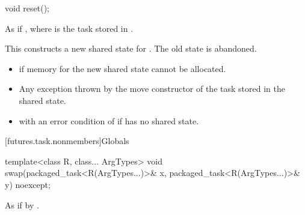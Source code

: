 %
\begin{itemdecl}
void reset();
\end{itemdecl}

\begin{itemdescr}
\pnum
\effects
As if , where
 is the task stored in
.
\begin{note}
This constructs a new shared state for . The
old state is abandoned.
\end{note}

\pnum
\throws
\begin{itemize}
\item {} if memory for the new shared state cannot be allocated.
\item Any exception thrown by the move constructor of the task stored in the shared
state.
\item {} with an error condition of  if 
has no shared state.
\end{itemize}
\end{itemdescr}

[futures.task.nonmembers]{Globals}

%
\begin{itemdecl}
template<class R, class... ArgTypes>
  void swap(packaged_task<R(ArgTypes...)>& x, packaged_task<R(ArgTypes...)>& y) noexcept;
\end{itemdecl}

\begin{itemdescr}
\pnum
\effects
As if by .
\end{itemdescr}
